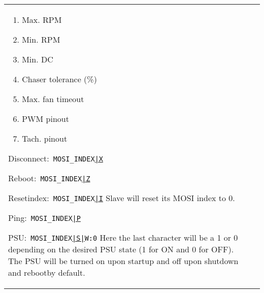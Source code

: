 \documentclass{article}
\begin{document}
\begin{center}
\begin{longtable}{| p{} | p{} |}
\begin{itemize}
{\begin{enumerate}
			\item Max. RPM
			\item Min. RPM
			\item Min. DC
			\item Chaser tolerance (\%)
			\item Max. fan timeout
			\item PWM pinout
			\item Tach. pinout
			\end{enumerate}
		\item {Disconnect:}\
		\linebreak\texttt{MOSI\_INDEX\underline{|X}}
		\item {Reboot:}\
		\linebreak\texttt{MOSI\_INDEX\underline{|Z}}
		\item {Reset\hspace{.5em}index:}\
		\linebreak\texttt{MOSI\_INDEX\underline{|I}}
		\linebreak Slave will reset its MOSI index to 0.
		\item {Ping:}\
		\linebreak\texttt{MOSI\_INDEX\underline{|P}}
		\item {PSU:}\
		\linebreak\texttt{MOSI\_INDEX\underline{|S|}W:0}
		\linebreak Here the last character will be a 1 or 0 depending on the desired PSU			state (1 for ON and 0 for OFF). The PSU will be turned on upon startup and off
			upon shutdown and rebootby default.
		
}
\end{itemize}
\end{longtable}
\end{center}
\end{document}
